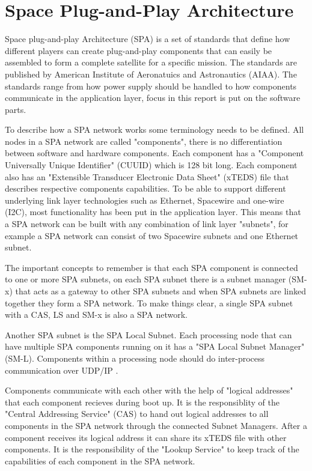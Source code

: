 \chapter{Space Plug-and-Play Architecture}\label{ch:spa}
Space plug-and-play Architecture (SPA) is a set of standards that define how
different players can create plug-and-play components that can easily be
assembled to form a complete satellite for a specific mission. The standards
are published by American Institute of Aeronatuics and Astronautics (AIAA). The
standards range from how power supply should be handled to how components
communicate in the application layer, focus in this report is put on the
software parts.

To describe how a SPA network works some terminology needs to be defined. All
nodes in a SPA network are called "components", there is no differentiation
between software and hardware components. Each component has a "Component
Universally Unique Identifier" (CUUID) which is 128 bit long. Each component
also has an "Extensible Transducer Electronic Data Sheet" (xTEDS) file that
describes respective components capabilities. To be able to support different
underlying link layer technologies such as Ethernet, Spacewire and one-wire
(I2C), most functionality has been put in the application layer. This means
that a SPA network can be built with any combination of link layer "subnets",
for example a SPA network can consist of two Spacewire subnets and one Ethernet
subnet.


The important concepts to remember is that each SPA component is
connected to one or more SPA subnets, on each SPA subnet there is a subnet
manager (SM-x) that acts as a gateway to other SPA subnets and when SPA subnets
are linked together they form a SPA network. To make things clear, a single SPA
subnet with a CAS, LS and SM-x is also a SPA network.

Another SPA subnet is the SPA Local Subnet. Each processing node that can
have multiple SPA components running on it has a "SPA Local Subnet Manager"
(SM-L).  Components within a processing node should do inter-process
communication over UDP/IP \cite{spa:local-subnet}.

Components communicate with each other with the help of "logical addresses"
that each component recieves during boot up. It is the responsiblity of the
"Central Addressing Service" (CAS) to hand out logical addresses to all
components in the SPA network through the connected Subnet Managers. After a
component receives its logical address it can share its xTEDS file with other
components. It is the responsibility of the "Lookup Service" to keep track of
the capabilities of each component in the SPA network.

